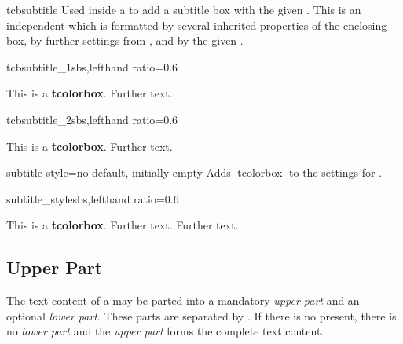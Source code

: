 \begin{docCommand}[doc new=2014-10-10]{tcbsubtitle}{}
  Used inside a  to add a subtitle box with the given .
  This is an independent  which is formatted by several
  inherited properties of the enclosing box, by further settings from
  , and by the given .
\begin{exdispExample*}{tcbsubtitle_1}{sbs,lefthand ratio=0.6}
\begin{tcolorbox}[title=My title,
    colback=red!5!white,
    colframe=red!75!black,
    fonttitle=\bfseries]
  This is a \textbf{tcolorbox}.
  Further text.
\end{tcolorbox}
\end{exdispExample*}
\begin{exdispExample*}{tcbsubtitle_2}{sbs,lefthand ratio=0.6}
\begin{tcolorbox}[title=My title,
    colback=red!5!white,
    colframe=red!75!black,
    colbacktitle=yellow!50!red,
    coltitle=red!25!black,
    fonttitle=\bfseries]
  This is a \textbf{tcolorbox}.
  Further text.
\end{tcolorbox}
\end{exdispExample*}
\end{docCommand}

\begin{docTcbKey}[][doc new=2014-10-10]{subtitle style}{=}{no default, initially empty}
  Adds |tcolorbox|  to the settings for .
\begin{exdispExample*}{subtitle_style}{sbs,lefthand ratio=0.6}
\begin{tcolorbox}[title=My title,
  colback=red!5!white,
  colframe=red!75!black,
  colbacktitle=yellow!50!red,
  coltitle=red!25!black,
  fonttitle=\bfseries,
  subtitle style={boxrule=0.4pt,
    colback=yellow!50!red!25!white,
    colupper=red!75!gray} ]
  This is a \textbf{tcolorbox}.
  Further text.
  Further text.
\end{tcolorbox}
\end{exdispExample*}
\end{docTcbKey}

\clearpage
\subsection{Upper Part}
The text content of a  may be parted into a mandatory \emph{upper part}
and an optional \emph{lower part}. These parts are separated by
. If there is no  present, there is no
\emph{lower part} and the \emph{upper part} forms the complete text content.

